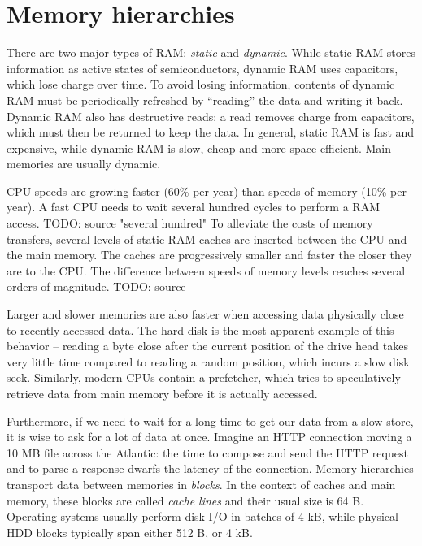 \section{Memory hierarchies}
There are two major types of RAM: \emph{static} and \emph{dynamic}.
While static RAM stores information as active states of semiconductors, dynamic
RAM uses capacitors, which lose charge over time. To avoid losing information,
contents of dynamic RAM must be periodically refreshed by ``reading'' the data
and writing it back. Dynamic RAM also has destructive reads: a read removes
charge from capacitors, which must then be returned to keep the data.
In general, static RAM is fast and expensive, while dynamic RAM is slow,
cheap and more space-efficient. Main memories are usually dynamic.

CPU speeds are growing faster (60\% per year) than speeds of memory (10\% per
year)\cite{Ailamaki:2004:DAN:1316689.1316801}. A fast CPU needs to wait several
hundred cycles to perform a RAM access. TODO: source "several hundred"
To alleviate the costs of memory transfers, several levels of static RAM
caches are inserted between the CPU and the main memory. The caches are
progressively smaller and faster the closer they are to the CPU. The difference
between speeds of memory levels reaches several orders of magnitude. TODO: source

Larger and slower memories are also faster when accessing data physically
close to recently accessed data. The hard disk is the most apparent example
of this behavior -- reading a byte close after the current position of the drive
head takes very little time compared to reading a random position, which incurs
a slow disk seek. %
Similarly, modern CPUs contain a prefetcher, which tries to speculatively
retrieve data from main memory before it is actually accessed.

Furthermore, if we need to wait for a long time to get our data from a slow
store, it is wise to ask for a lot of data at once. Imagine an HTTP connection
moving a 10 MB file across the Atlantic: the time to compose and send the HTTP
request and to parse a response dwarfs the latency of the connection.
Memory hierarchies transport data between memories in \emph{blocks}.
In the context of caches and main memory, these blocks are called
\emph{cache lines} and their usual size is 64 B.
Operating systems usually perform disk I/O in batches of 4 kB,
while physical HDD blocks typically span either 512 B, or 4 kB.

